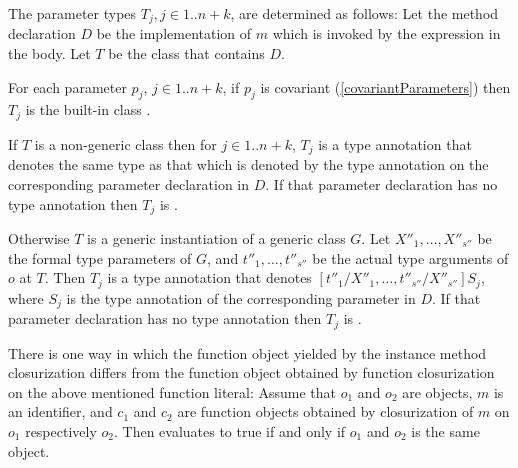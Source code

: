 \documentclass[makeidx]{article}
\begin{document}
{\LMHash{}%
The parameter types $T_j, j \in 1 .. n+k$, are determined as follows:
Let the method declaration $D$ be the implementation of $m$
which is invoked by the expression in the body.
Let $T$ be the class that contains $D$.


\LMHash{}%
For each parameter $p_j$, $j \in 1 .. n+k$, if $p_j$ is covariant
(\ref{covariantParameters})
then $T_j$ is the built-in class .


\LMHash{}%
If $T$ is a non-generic class then for $j \in 1 .. n+k$,
$T_j$ is a type annotation that denotes the same type as that
which is denoted by the type annotation on
the corresponding parameter declaration in $D$.
If that parameter declaration has no type annotation then $T_j$ is \DYNAMIC.

\LMHash{}%
Otherwise $T$ is a generic instantiation of a generic class $G$.
Let $X''_1, \ldots, X''_{s''}$ be the formal type parameters of $G$,
and $t''_1, \ldots, t''_{s''}$ be the actual type arguments of $o$ at $T$.
Then $T_j$ is a type annotation that denotes
$[t''_1/X''_1, \ldots, t''_{s''}/X''_{s''}]S_j$,
where $S_j$ is the type annotation of the corresponding parameter in $D$.
If that parameter declaration has no type annotation then $T_j$ is \DYNAMIC.

\LMHash{}%
There is one way in which
the function object yielded by the instance method closurization differs from
the function object obtained by function closurization on
the above mentioned function literal:
Assume that $o_1$ and $o_2$ are objects, $m$ is an identifier,
and $c_1$ and $c_2$ are function objects
obtained by closurization of $m$ on $o_1$ respectively $o_2$.
Then  evaluates to true
if and only if $o_1$ and $o_2$ is the same object.


}
\end{document}
